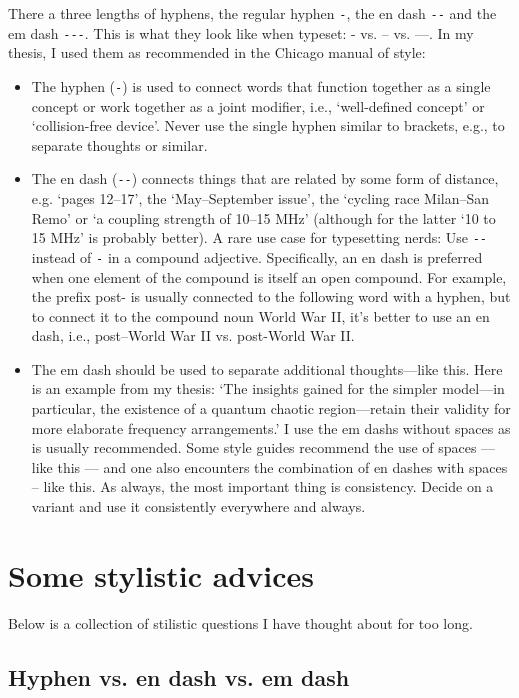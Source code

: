 There a three lengths of hyphens, the regular hyphen \verb|-|, the en dash \verb|--| and the em dash \verb|---|.
This is what they look like when typeset: - vs. -- vs. ---.
In my thesis, I used them as recommended in the Chicago manual of style:
\begin{itemize}
\item The hyphen (\verb|-|) is used to connect words that function together as a single concept or work together as a joint modifier, i.e., `well-defined concept' or `collision-free device'. Never use the single hyphen similar to brackets, e.g., to separate thoughts or similar.
\item The en dash (\verb|--|) connects things that are related by some form of distance, e.g. `pages 12--17', the `May--September issue', the `cycling race Milan--San Remo' or `a coupling strength of 10--15 MHz' (although for the latter `10 to 15 MHz' is probably better). A rare use case for typesetting nerds: Use \verb|--| instead of \verb|-| in a compound adjective. Specifically, an en dash is preferred when one element of the compound is itself an open compound. For example, the prefix post- is usually connected to the following word with a hyphen, but to connect it to the compound noun World War II, it's better to use an en dash, i.e., post--World War II vs. post-World War II.
\item The em dash should be used to separate additional thoughts---like this. Here is an example from my thesis: `The insights gained for the simpler model---in particular, the existence of a quantum chaotic region---retain their validity for more elaborate frequency arrangements.' I use the em dashs without spaces as is usually recommended. Some style guides recommend the use of spaces --- like this --- and one also encounters the combination of en dashes with spaces -- like this. As always, the most important thing is consistency. Decide on a variant and use it consistently everywhere and always.
\end{itemize}



\section{Some stylistic advices}
Below is a collection of stilistic questions I have thought about for too long.
\subsection{Hyphen vs. en dash vs. em dash}

